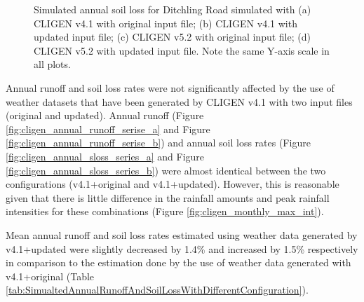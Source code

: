 \begin{figure}[htbp]
  \centering
  \qquad
  \caption[Simulated annual soil loss for Ditchling Road]{Simulated annual
soil loss for Ditchling Road simulated with (a) CLIGEN v4.1 with original input
file; (b) CLIGEN v4.1 with updated input file; (c) CLIGEN v5.2 with original
input file; (d) CLIGEN v5.2 with updated input file. Note the same Y-axis scale
in all plots.}
  \label{fig:cligen_annual_sloss_series}
\end{figure}

Annual runoff and soil loss rates were not significantly affected by the use of
weather datasets that have been generated by CLIGEN v4.1 with two input
files (original and updated). Annual runoff (Figure
\ref{fig:cligen_annual_runoff_serise_a} and Figure
\ref{fig:cligen_annual_runoff_serise_b}) and annual soil loss rates (Figure
\ref{fig:cligen_annual_sloss_series_a} and Figure
\ref{fig:cligen_annual_sloss_series_b}) were almost identical between the two
configurations (v4.1+original and v4.1+updated). However, this is reasonable
given that there is little difference in the rainfall amounts and peak rainfall
intensities for these combinations (Figure \ref{fig:cligen_monthly_max_int}).

Mean annual runoff and soil loss rates estimated using weather data generated by
v4.1+updated were slightly decreased by 1.4\% and increased by 1.5\%
respectively in comparison to the estimation done by the use of weather data
generated with v4.1+original
(Table \ref{tab:SimualtedAnnualRunoffAndSoilLossWithDifferentConfiguration}).

